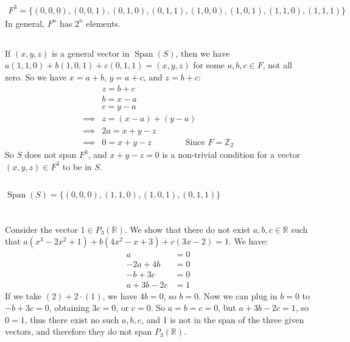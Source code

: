 \documentclass[11pt]{article}
\DeclareMathOperator{\Span}{Span}
\begin{document}
\renewcommand{\thesubsection}{\thesection.\alph{subsection}}


\section{} %
\subsection{} %
\begin{align*}
	F^3=\{(0,0,0),(0,0,1),(0,1,0),(0,1,1),(1,0,0),(1,0,1),(1,1,0),(1,1,1)\}
\end{align*}
In general, $F^n$ has $2^n$ elements.


\subsection{} %
If $(x,y,z)$ is a general vector in $\Span(S)$, then we have
$a(1,1,0)+b(1,0,1)+c(0,1,1)=(x,y,z)$ for some $a,b,c\in F$, not all zero. So we
have $x=a+b$, $y=a+c$, and $z=b+c$:
\begin{align*}
	&z=b+c\\
	&b=x-a\\
	&c=y-a\\
	\implies &z=(x-a)+(y-a)\\
	\implies &2a=x+y-z\\
	\implies &0=x+y-z\qquad\qquad\text{Since $F=\mathbb{Z}_2$}
\end{align*}
So $S$ does not span $F^3$, and $x+y-z=0$ is a non-trivial condition
for a vector $(x,y,z)\in F^3$ to be in $S$.


\subsection{} %
$\Span(S)=\{(0,0,0),(1,1,0),(1,0,1),(0,1,1)\}$


\section{} %
Consider the vector $1\in P_3(\mathbb{R})$. We show that there do not exist
$a,b,c\in\mathbb{R}$ such that $a(x^3-2x^2+1)+b(4x^2-x+3)+c(3x-2)=1$. We
have:
\begin{align}
	a&=0\\
	-2a+4b&=0\\
	-b+3c&=0\\
	a+3b-2c&=1
\end{align}
If we take $(2)+2\cdot(1)$, we have $4b=0$, so $b=0$. Now we can plug in $b=0$
to $-b+3c=0$, obtaining $3c=0$, or $c=0$. So $a=b=c=0$, but $a+3b-2c=1$, so
$0=1$, thus there exist no such $a,b,c$, and 1 is not in the span of the three
given vectors, and therefore they do not span $P_3(\mathbb{R})$.
\end{document}
